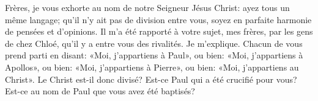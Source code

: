 Frères, je vous exhorte au nom de notre Seigneur Jésus Christ:
	ayez tous un même langage;
	qu’il n’y ait pas de division entre vous,
	soyez en parfaite harmonie de pensées et d’opinions.
Il m’a été rapporté à votre sujet, mes frères, par les gens de chez Chloé,
	qu’il y a entre vous des rivalités.
Je m’explique.
	Chacun de vous prend parti en disant: «Moi, j’appartiens à Paul»,
	ou bien: «Moi, j’appartiens à Apollos»,
	ou bien: «Moi, j’appartiens à Pierre»,
	ou bien: «Moi, j’appartiens au Christ».
Le Christ est-il donc divisé?
Est-ce Paul qui a été crucifié pour vous?
Est-ce au nom de Paul que vous avez été baptisés?
